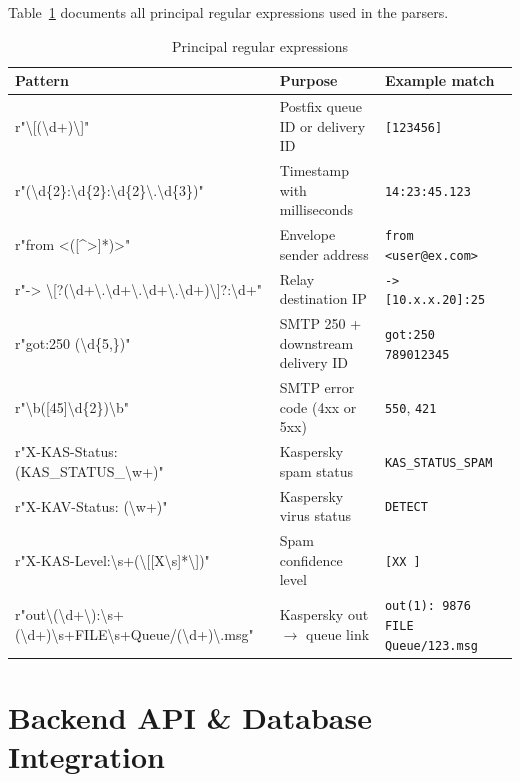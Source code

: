 \documentclass[12pt,a4paper,oneside]{report}
\newcommand{\rowA}{\rowcolor{rowgray}}
\begin{document}
Table~\ref{tab:regex} documents all principal regular expressions used in the parsers.

\begin{table}[H]
\centering
\caption{Principal regular expressions}
\label{tab:regex}
\begin{tabularx}{\textwidth}{@{}>{\ttfamily\small}p{5.4cm} X p{3.2cm}@{}}
\toprule
\textnormal{Pattern} & Purpose & Example match \\
\midrule
\rowA r"\textbackslash[(\textbackslash d+)\textbackslash]" & Postfix queue ID or delivery ID & \texttt{[123456]} \\
r"(\textbackslash d\{2\}:\textbackslash d\{2\}:\textbackslash d\{2\}\textbackslash.\textbackslash d\{3\})" & Timestamp with milliseconds & \texttt{14:23:45.123} \\
\rowA r"from <([{\textasciicircum}>]*)>" & Envelope sender address & \texttt{from <user@ex.com>} \\
r"-> \textbackslash[?(\textbackslash d+\textbackslash.\textbackslash d+\textbackslash.\textbackslash d+\textbackslash.\textbackslash d+)\textbackslash]?:\textbackslash d+" & Relay destination IP & \texttt{-> [10.x.x.20]:25} \\
\rowA r"got:250 (\textbackslash d\{5,\})" & SMTP 250 + downstream delivery ID & \texttt{got:250 789012345} \\
r"\textbackslash b([45]\textbackslash d\{2\})\textbackslash b" & SMTP error code (4xx or 5xx) & \texttt{550}, \texttt{421} \\
\rowA r"X-KAS-Status: (KAS\_STATUS\_\textbackslash w+)" & Kaspersky spam status & \texttt{KAS\_STATUS\_SPAM} \\
r"X-KAV-Status: (\textbackslash w+)" & Kaspersky virus status & \texttt{DETECT} \\
\rowA r"X-KAS-Level:\textbackslash s+(\textbackslash [[X\textbackslash s]*\textbackslash])" & Spam confidence level & \texttt{[XX  ]} \\
r"out\textbackslash(\textbackslash d+\textbackslash):\textbackslash s+(\textbackslash d+)\textbackslash s+FILE\textbackslash s+Queue/(\textbackslash d+)\textbackslash.msg" & Kaspersky out $\rightarrow$ queue link & \texttt{out(1): 9876 FILE Queue/123.msg} \\
\bottomrule
\end{tabularx}
\end{table}

\section{Backend API \& Database Integration}
\end{document}

